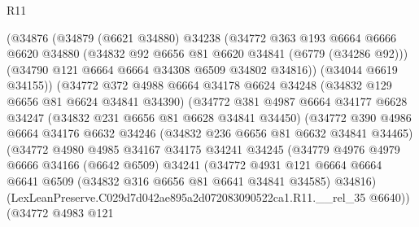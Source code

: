 \begin{lexlean}{R11}
\begin{coremodule}
                    (@34876
                      (@34879
                        (@6621 @34880)
                        @34238
                        (@34772
                          @363
                          @193
                          @6664
                          @6666
                          @6620
                          @34880
                          (@34832 @92 @6656 @81 @6620 @34841 (@6779 (@34286 @92)))
                          (@34790 @121 @6664 @6664 @34308 @6509 @34802 @34816))
                        (@34044 @6619 @34155))
                      (@34772
                        @372
                        @4988
                        @6664
                        @34178
                        @6624
                        @34248
                        (@34832 @129 @6656 @81 @6624 @34841 @34390)
                        (@34772
                          @381
                          @4987
                          @6664
                          @34177
                          @6628
                          @34247
                          (@34832 @231 @6656 @81 @6628 @34841 @34450)
                          (@34772
                            @390
                            @4986
                            @6664
                            @34176
                            @6632
                            @34246
                            (@34832 @236 @6656 @81 @6632 @34841 @34465)
                            (@34772
                              @4980
                              @4985
                              @34167
                              @34175
                              @34241
                              @34245
                              (@34779
                                @4976
                                @4979
                                @6666
                                @34166
                                (@6642 @6509)
                                @34241
                                (@34772
                                  @4931
                                  @121
                                  @6664
                                  @6664
                                  @6641
                                  @6509
                                  (@34832 @316 @6656 @81 @6641 @34841 @34585)
                                  @34816)
                                (LexLeanPreserve.C029d7d042ae895a2d072083090522ca1.R11.__rel_35
                                  @6640))
                              (@34772
                                @4983
                                @121

\end{coremodule}
\end{lexlean}
